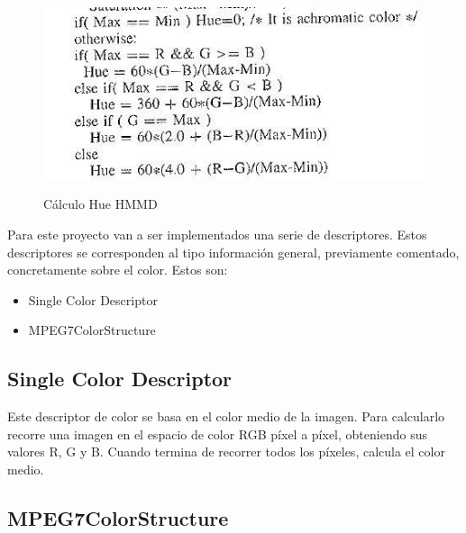 \begin{figure}[H] %
\centering
\includegraphics[scale=0.7]{imagenes/hmmd2.jpg}  %
\label{hmmd2.jpg}
\caption{Cálculo Hue HMMD}
\end{figure}


Para este proyecto van a ser implementados una serie de descriptores. Estos descriptores se corresponden al tipo información general, previamente comentado, concretamente sobre el color. Estos son:

\begin{itemize}

\item Single Color Descriptor

\item MPEG7ColorStructure

\end{itemize}

\subsection{Single Color Descriptor}

Este descriptor de color se basa en el color medio de la imagen. Para calcularlo recorre una imagen en el espacio de color RGB píxel a píxel, obteniendo sus valores R, G y B. Cuando termina de recorrer todos los píxeles, calcula el color medio.

\subsection{MPEG7ColorStructure}

